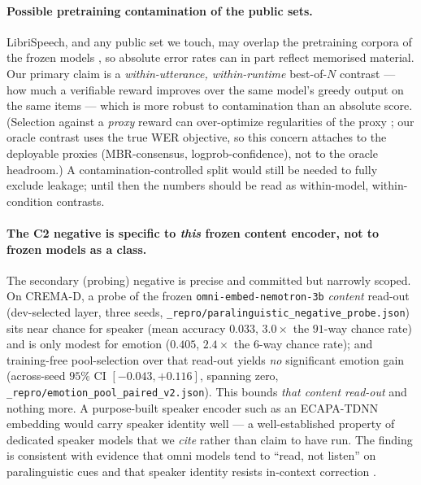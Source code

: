 \paragraph{Possible pretraining contamination of the public sets.}
LibriSpeech, and any public set we touch, may overlap the pretraining corpora of the frozen models
\citep{contaminationsurvey2024,gorman2019splits,taskcontamination2024}, so absolute error rates can in
part reflect memorised material. Our primary claim is a \emph{within-utterance, within-runtime}
best-of-$N$ contrast --- how much a verifiable reward improves over the same model's greedy output on
the same items --- which is more robust to contamination than an absolute score. (Selection against a
\emph{proxy} reward can over-optimize regularities of the proxy \citep{gao2023overopt,skalse2022rewardhacking,spuriousrewards2025};
our oracle contrast uses the true WER objective, so this concern attaches to the deployable proxies
(MBR-consensus, logprob-confidence), not to the oracle headroom.) A
contamination-controlled split would still be needed to fully exclude leakage; until then the numbers
should be read as within-model, within-condition contrasts.

\paragraph{The C2 negative is specific to \emph{this} frozen content encoder, not to frozen models as a class.}
The secondary (probing) negative is precise and committed but narrowly scoped. On CREMA-D, a probe of
the frozen \texttt{omni-embed-nemotron-3b} \emph{content} read-out (dev-selected layer, three seeds,
\texttt{\_repro/paralinguistic\_negative\_probe.json}) sits near chance for speaker (mean accuracy
$0.033$, $3.0\times$ the $91$-way chance rate) and is only modest for emotion ($0.405$, $2.4\times$ the
$6$-way chance rate); and training-free pool-selection over that read-out yields \emph{no} significant
emotion gain (across-seed $95\%$ CI $[-0.043,+0.116]$, spanning zero,
\texttt{\_repro/emotion\_pool\_paired\_v2.json}). This bounds \emph{that content read-out} and nothing
more. A purpose-built speaker encoder such as an ECAPA-TDNN embedding \citep{ecapatdnn2020} would carry
speaker identity well --- a well-established property of dedicated speaker models that we \emph{cite}
rather than claim to have run. The finding is consistent with evidence that omni models tend to
``read, not listen'' on paralinguistic cues \citep{voxparadox2026,listenortranscribe2025} and that
speaker identity resists in-context correction \citep{spkverifllm2026}.


